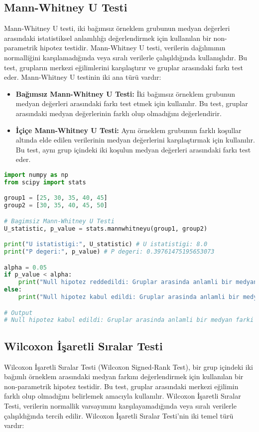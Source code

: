 \subsection{Mann-Whitney U Testi}
Mann-Whitney U testi, iki bağımsız örneklem grubunun medyan değerleri arasındaki istatistiksel anlamlılığı değerlendirmek için kullanılan bir non-parametrik hipotez testidir. Mann-Whitney U testi, verilerin dağılımının normalliğini karşılamadığında veya sıralı verilerle çalışıldığında kullanışlıdır. Bu test, grupların merkezi eğilimlerini karşılaştırır ve gruplar arasındaki farkı test eder. Mann-Whitney U testinin iki ana türü vardır:

\begin{itemize}
    \item \textbf{Bağımsız Mann-Whitney U Testi:} İki bağımsız örneklem grubunun medyan değerleri arasındaki farkı test etmek için kullanılır. Bu test, gruplar arasındaki medyan değerlerinin farklı olup olmadığını değerlendirir.
    \item \textbf{İçiçe Mann-Whitney U Testi:} Aynı örneklem grubunun farklı koşullar altında elde edilen verilerinin medyan değerlerini karşılaştırmak için kullanılır. Bu test, aynı grup içindeki iki koşulun medyan değerleri arasındaki farkı test eder.
\end{itemize}

\begin{lstlisting}[language=Python]
import numpy as np
from scipy import stats

group1 = [25, 30, 35, 40, 45]
group2 = [30, 35, 40, 45, 50]

# Bagimsiz Mann-Whitney U Testi
U_statistic, p_value = stats.mannwhitneyu(group1, group2)

print("U istatistigi:", U_statistic) # U istatistigi: 8.0
print("P degeri:", p_value) # P degeri: 0.39761475195653073

alpha = 0.05
if p_value < alpha:
    print("Null hipotez reddedildi: Gruplar arasinda anlamli bir medyan farki vardir.")
else:
    print("Null hipotez kabul edildi: Gruplar arasinda anlamli bir medyan farki yoktur.")

# Output
# Null hipotez kabul edildi: Gruplar arasinda anlamli bir medyan farki yoktur.
\end{lstlisting}

\subsection{Wilcoxon İşaretli Sıralar Testi}
Wilcoxon İşaretli Sıralar Testi (Wilcoxon Signed-Rank Test), bir grup içindeki iki bağımlı örneklem arasındaki medyan farkını değerlendirmek için kullanılan bir non-parametrik hipotez testidir. Bu test, gruplar arasındaki merkezi eğilimin farklı olup olmadığını belirlemek amacıyla kullanılır. Wilcoxon İşaretli Sıralar Testi, verilerin normallik varsayımını karşılayamadığında veya sıralı verilerle çalışıldığında tercih edilir. Wilcoxon İşaretli Sıralar Testi'nin iki temel türü vardır:

